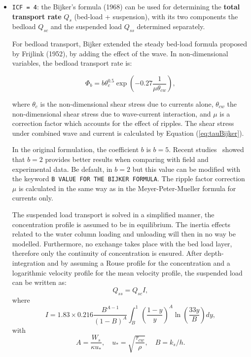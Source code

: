 \begin{itemize}
\item \texttt{ICF = 4}: the Bijker's formula (1968) can be used for determining the \textbf{total transport
rate} $Q_s$ (bed-load + suspension), with its two components the bedload 
$Q_{sc}$ and the suspended load $Q_{ss}$ determined separately. %

For bedload transport, Bijker extended the steady bed-load formula proposed by Frijlink (1952),
by adding the effect of the wave. In non-dimensional variables, the
bedload transport rate is:

\begin{equation*}
\Phi_b = b\theta_c^{0.5}\exp\left(-0.27\frac{1}{\mu \theta_{cw}}\right),
\end{equation*}

where $\theta_c$ is the non-dimensional shear stress due to currents
alone, $\theta_{cw}$ the non-dimensional shear stress due to wave-current
interaction, and $\mu$ is a correction factor which accounts for the effect
of ripples. The shear stress under combined wave and current is calculated
by Equation (\ref{eq:tauBijker}).

In the original formulation, the coefficient $b$ is $b=5$. Recent studies~\cite{17} showed
that $b=2$ provides better results when comparing with field and experimental data. Be default, in \sisyphe $b=2$ but this value can be modified with the keyword \texttt{B VALUE FOR THE BIJKER FORMULA}. The ripple factor correction $\mu$ is calculated in the same way as in the
Meyer-Peter-Mueller formula for currents only.

The suspended load transport is solved in a simplified manner, the
concentration profile is assumed to be in equilibrium. The
inertia effects related to the water column loading and unloading will then
in no way be modelled. Furthermore, no exchange takes place with the bed
load layer, therefore only the continuity of concentration is ensured. After depth-integration and by assuming a Rouse profile for the concentration
and a logarithmic velocity profile for the mean velocity profile, the
suspended load can be written as:
\begin{equation*}
Q_{ss} = Q_{sc} I,
\end{equation*}
where 
\begin{equation*}
I=1.83\times 0.216\frac{B^{A-1}}{(1-B)^A} \int_B^1
\left(\frac{1-y}{y}\right)^A \ln\left(\frac{33y}{B}\right) d y, 
\end{equation*}
with  
\begin{equation*}
A = \frac{W_s}{\kappa u_*},\quad u_*=\sqrt{\frac{\tau_{cw}}{\rho}},\quad B = k_s/h.
\end{equation*}


\end{itemize}
